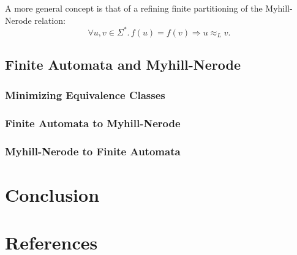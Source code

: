 \documentclass[11pt,a4paper,oneside]{book}
\begin{document}

                    A more general concept is that of a refining finite partitioning of the Myhill-Nerode relation:
                    \[
                        \forall u, v \in \Sigma^*. \,
                        f(u) = f(v) \Rightarrow u \approx_L v.
                    \]







        \section{Finite Automata and Myhill-Nerode}

            \paragraph{}

            \subsection{Minimizing Equivalence Classes}

                \paragraph{}
            
            \subsection{Finite Automata to Myhill-Nerode}

                \paragraph{}

            \subsection{Myhill-Nerode to Finite Automata}

                \paragraph{}


    \chapter{Conclusion}

    \chapter{References}

    {}
    
\end{document}
